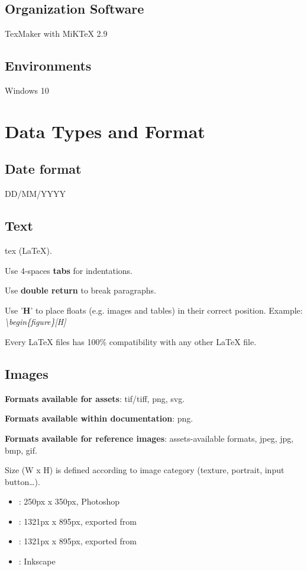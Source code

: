 \documentclass[12pt]{article}
\begin{document}
\subsection{Organization Software}
TexMaker with MiKTeX 2.9

\subsection{Environments}
Windows 10

\section{Data Types and Format}

\subsection{Date format}
DD/MM/YYYY

\subsection{Text}
tex (LaTeX).

Use 4-spaces \textbf{tabs} for indentations.

Use \textbf{double return} to break paragraphs.

Use '\textbf{H}' to place floats (e.g. images and tables) in their correct position. Example: \textit{\textbackslash{}begin\{figure\}[H]}

Every LaTeX files has 100\% compatibility with any other LaTeX file.

\subsection{Images}
\textbf{Formats available for assets}: tif/tiff, png, svg.

\textbf{Formats available within documentation}: png.

\textbf{Formats available for reference images}: assets-available formats, jpeg, jpg, bmp, gif.

Size (W x H) is defined according to image category (texture, portrait, input button…).
\begin{itemize}
	\item \textbf{}: 250px x 350px, Photoshop
	\item \textbf{}: 1321px x 895px, exported from 
	\item \textbf{}: 1321px x 895px, exported from 
	\item \textbf{}: Inkscape
\end{itemize}
\end{document}
